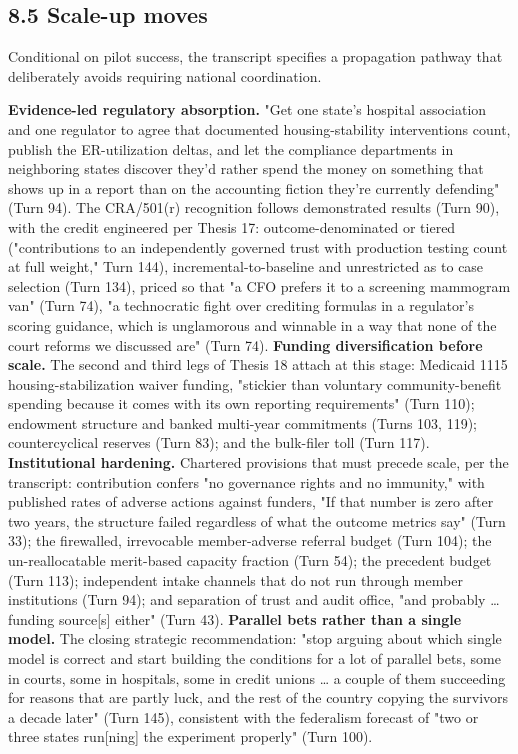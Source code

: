 \documentclass[sigconf,nonacm=true]{acmart}
\begin{document}
\subsection{8.5 Scale-up moves}

Conditional on pilot success, the transcript specifies a propagation pathway that deliberately avoids requiring national coordination.

\textbf{Evidence-led regulatory absorption.} "Get one state's hospital association and one regulator to agree that documented housing-stability interventions count, publish the ER-utilization deltas, and let the compliance departments in neighboring states discover they'd rather spend the money on something that shows up in a report than on the accounting fiction they're currently defending" (Turn 94). The CRA/501(r) recognition follows demonstrated results (Turn 90), with the credit engineered per Thesis 17: outcome-denominated or tiered ("contributions to an independently governed trust with production testing count at full weight," Turn 144), incremental-to-baseline and unrestricted as to case selection (Turn 134), priced so that "a CFO prefers it to a screening mammogram van" (Turn 74),  "a technocratic fight over crediting formulas in a regulator's scoring guidance, which is unglamorous and winnable in a way that none of the court reforms we discussed are" (Turn 74).
\textbf{Funding diversification before scale.} The second and third legs of Thesis 18 attach at this stage: Medicaid 1115 housing-stabilization waiver funding, "stickier than voluntary community-benefit spending because it comes with its own reporting requirements" (Turn 110); endowment structure and banked multi-year commitments (Turns 103, 119); countercyclical reserves (Turn 83); and the bulk-filer toll (Turn 117).
\textbf{Institutional hardening.} Chartered provisions that must precede scale, per the transcript: contribution confers "no governance rights and no immunity," with published rates of adverse actions against funders,  "If that number is zero after two years, the structure failed regardless of what the outcome metrics say" (Turn 33); the firewalled, irrevocable member-adverse referral budget (Turn 104); the un-reallocatable merit-based capacity fraction (Turn 54); the precedent budget (Turn 113); independent intake channels that do not run through member institutions (Turn 94); and separation of trust and audit office, "and probably … funding source[s] either" (Turn 43).
\textbf{Parallel bets rather than a single model.} The closing strategic recommendation: "stop arguing about which single model is correct and start building the conditions for a lot of parallel bets,  some in courts, some in hospitals, some in credit unions … a couple of them succeeding for reasons that are partly luck, and the rest of the country copying the survivors a decade later" (Turn 145), consistent with the federalism forecast of "two or three states run[ning] the experiment properly" (Turn 100).
\end{document}
